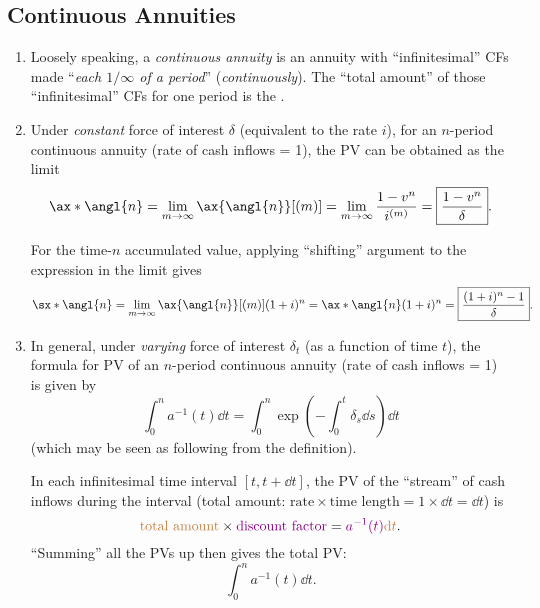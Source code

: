 \subsection{Continuous Annuities}
\label{subsect:cts-annuity}
\begin{enumerate}
\item Loosely speaking, a \emph{continuous annuity} is an annuity with
``infinitesimal'' CFs made ``\emph{each \(1/\infty\) of a period}''
(\emph{continuously}). The ``total amount'' of those ``infinitesimal'' CFs for
one period is the .
\item \label{it:pv-av-cts-annuity}
Under \emph{constant} force of interest \(\delta\) (equivalent to the rate
\(i\)), for an \(n\)-period continuous annuity (rate of cash inflows = 1), the
PV can be obtained as the limit
\[
\ax*{\angl{n}}=\lim_{m\to \infty}\ax{\angl{n}}[(m)]=\lim_{m\to \infty}\frac{1-v^n}{i^{(m)}}
=\boxed{\frac{1-v^n}{\delta}}.
\]

For the time-\(n\) accumulated value, applying ``shifting'' argument to the
expression in the limit gives
\[
\sx*{\angl{n}}=\lim_{m\to \infty}\ax{\angl{n}}[(m)](1+i)^n
=\ax*{\angl{n}}(1+i)^n
=\boxed{\frac{(1+i)^n-1}{\delta}}.
\]

\item \label{it:pv-varying-foi-cts-annuity}
In general, under \emph{varying} force of interest \(\delta_t\) (as
a function of time \(t\)), the formula for PV of an \(n\)-period continuous
annuity (rate of cash inflows = 1) is given by
\[
\int_{0}^{n}a^{-1}(t)\dd{t}
=\int_{0}^{n}\exp(-\int_{0}^{t}\delta_s\dd{s})\dd{t}
\]
(which may be seen as following from the definition).

\begin{intuition}
In each infinitesimal time interval \([t,t+\dd{t}]\), the PV of the ``stream''
of cash inflows during the interval (total amount: \(\text{rate}\times\text{time length}=1\times \dd{t}=\dd{t}\)) is
\[{\color{brown}\text{total amount}}\times{\color{violet}\text{discount factor}}
={\color{violet}a^{-1}(t)}{\color{brown}\dd{t}}.\]
``Summing'' all the PVs up then gives the total PV:
\[
\int_{0}^{n}a^{-1}(t)\dd{t}.
\]
\end{intuition}
\end{enumerate}
